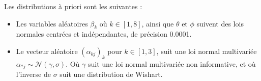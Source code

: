     Les distributions à priori sont les suivantes : 
    \begin{itemize}
        \item Les variables aléatoires $\beta_k$ où $k \in [1,8]$, ainsi que $\theta$ et $\phi$ suivent des lois normales centrées et indépendantes, de précision 0.0001.
        \item Le vecteur aléatoire $(\alpha_{kj})_k$ pour $k \in [1,3]$, suit une loi normal multivariée $\alpha_{*j} \sim \mathcal{N}( \gamma, \sigma)$. Où $\gamma$ suit une loi normal multivariée non informative, et où l'inverse de  $\sigma$ suit une distribution de Wishart.
    \end{itemize}
    
    